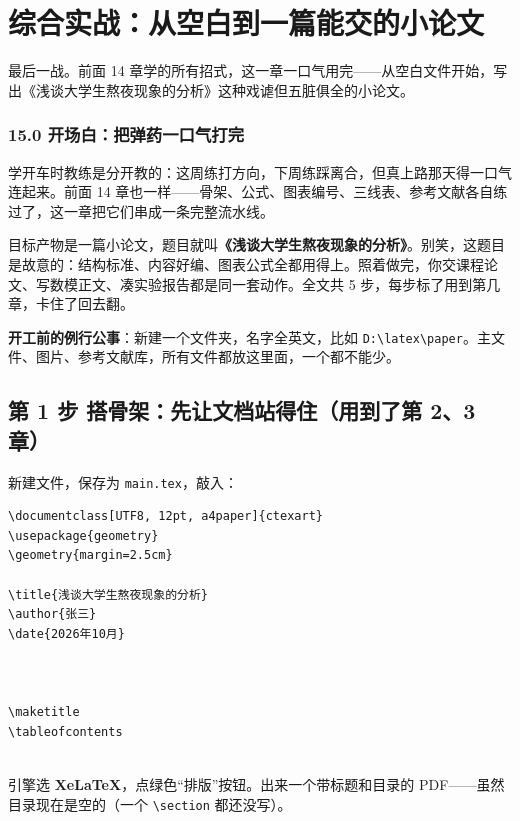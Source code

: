 \chapter{综合实战：从空白到一篇能交的小论文}

\begin{notebox}
最后一战。前面 14 章学的所有招式，这一章一口气用完——从空白文件开始，写出《浅谈大学生熬夜现象的分析》这种戏谑但五脏俱全的小论文。
\end{notebox}

\subsection*{15.0 开场白：把弹药一口气打完}

学开车时教练是分开教的：这周练打方向，下周练踩离合，但真上路那天得一口气连起来。前面 14 章也一样——骨架、公式、图表编号、三线表、参考文献各自练过了，这一章把它们串成一条完整流水线。

目标产物是一篇小论文，题目就叫\textbf{《浅谈大学生熬夜现象的分析》}。别笑，这题目是故意的：结构标准、内容好编、图表公式全都用得上。照着做完，你交课程论文、写数模正文、凑实验报告都是同一套动作。全文共 5 步，每步标了用到第几章，卡住了回去翻。

\textbf{开工前的例行公事}：新建一个文件夹，名字全英文，比如 \texttt{D:\textbackslash{}latex\textbackslash{}paper}。主文件、图片、参考文献库，所有文件都放这里面，一个都不能少。

\section*{第 1 步 搭骨架：先让文档站得住（用到了第 2、3 章）}

新建文件，保存为 \texttt{main.tex}，敲入：

\begin{lstlisting}
\documentclass[UTF8, 12pt, a4paper]{ctexart}
\usepackage{geometry}
\geometry{margin=2.5cm}

\title{浅谈大学生熬夜现象的分析}
\author{张三}
\date{2026年10月}



\maketitle
\tableofcontents


\end{lstlisting}

引擎选 \textbf{XeLaTeX}，点绿色“排版”按钮。出来一个带标题和目录的 PDF——虽然目录现在是空的（一个 \texttt{\textbackslash{}section} 都还没写）。

